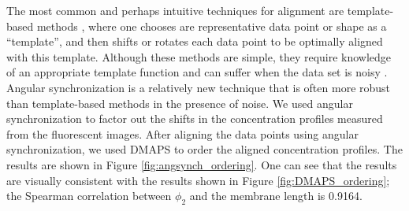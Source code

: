 \documentclass[10pt]{article}
\begin{document}
The most common and perhaps intuitive techniques for alignment are template-based methods \cite{ahuja2007template}, where one chooses are representative data point or shape as a ``template'', and then shifts or rotates each data point to be optimally aligned with this template.
%
Although these methods are simple, they require knowledge of an appropriate template function and can suffer when the data set is noisy \cite{sonday2013noisy}.
%
Angular synchronization \cite{singer2011angular} is a relatively new technique that is often more robust than template-based methods in the presence of noise.
%
We used angular synchronization to factor out the shifts in the concentration profiles measured from the fluorescent images.
%
After aligning the data points using angular synchronization, we used DMAPS to order the aligned concentration profiles.
%
The results are shown in Figure \ref{fig:angsynch_ordering}.
%
One can see that the results are visually consistent with the results shown in Figure \ref{fig:DMAPS_ordering}; the Spearman correlation between $\phi_2$ and the membrane length is 0.9164. 
\end{document}
